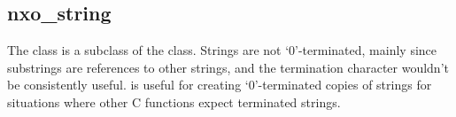 %
%
%
%
%

\subsection{nxo\_string}
\label{nxo_string}

The  class is a subclass of the  class.
Strings are not `{\bs}0'-terminated, mainly since substrings are references to
other strings, and the termination character wouldn't be consistently useful.
 is useful for creating `{\bs}0'-terminated copies
of strings for situations where other C functions expect terminated strings.

